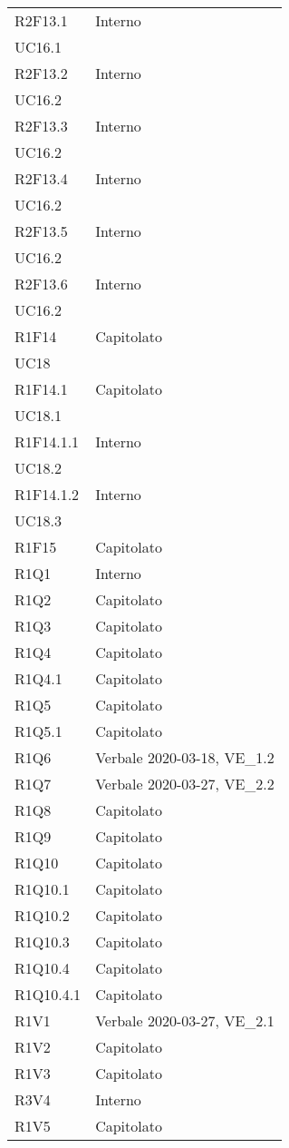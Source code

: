 \begin{longtable}{ 
		>{\centering}p{}
		>{\centering}p{}}
	R2F13.1	& Interno	\\ UC16.1 \tabularnewline
	R2F13.2	& Interno	\\ UC16.2 \tabularnewline
	R2F13.3	& Interno	\\ UC16.2 \tabularnewline
	R2F13.4	& Interno	\\ UC16.2 \tabularnewline
	R2F13.5	& Interno	\\ UC16.2 \tabularnewline
	R2F13.6	& Interno	\\ UC16.2 \tabularnewline
	R1F14	& Capitolato\\	UC18 \tabularnewline
	R1F14.1	& Capitolato\\	UC18.1 \tabularnewline
	R1F14.1.1 &	Interno	\\UC18.2 \tabularnewline
	R1F14.1.2 &	Interno	\\ UC18.3 \tabularnewline
	R1F15 &	Capitolato \tabularnewline 
	R1Q1 &	Interno	 \tabularnewline
	R1Q2 & 	Capitolato	 \tabularnewline
	R1Q3 & 	Capitolato \tabularnewline
	R1Q4 &	Capitolato \tabularnewline	
	R1Q4.1 &	Capitolato	\tabularnewline
	R1Q5 &	Capitolato	 \tabularnewline
	R1Q5.1 &	Capitolato	 \tabularnewline 
	R1Q6 &	Verbale 2020-03-18, VE\_1.2	\tabularnewline
	R1Q7 &	Verbale 2020-03-27, VE\_2.2	\tabularnewline
	R1Q8 & 	Capitolato	 \tabularnewline
	R1Q9 &	Capitolato	\tabularnewline
	R1Q10 &	Capitolato\tabularnewline
	R1Q10.1 & 	Capitolato\tabularnewline
	R1Q10.2	& Capitolato \tabularnewline
	R1Q10.3	& Capitolato \tabularnewline
	R1Q10.4	& Capitolato \tabularnewline
	R1Q10.4.1 &	Capitolato \tabularnewline
	R1V1 &	Verbale 2020-03-27, VE\_2.1 \tabularnewline
	R1V2 &	Capitolato \tabularnewline
	R1V3 &	Capitolato \tabularnewline
	R3V4 &	Interno \tabularnewline
	R1V5 &	Capitolato \tabularnewline

	
\end{longtable}	
